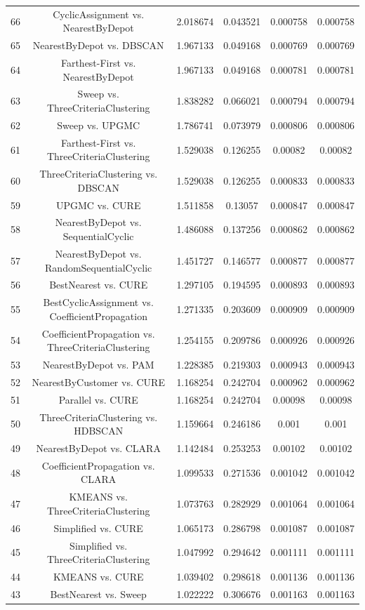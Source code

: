 \documentclass[a4paper,10pt]{article}
\begin{document}
\begin{landscape}
\begin{table}[!htp]
\begin{tabular}{cccccc}
66&CyclicAssignment vs. NearestByDepot&2.018674&0.043521&0.000758&0.000758\\
65&NearestByDepot vs. DBSCAN&1.967133&0.049168&0.000769&0.000769\\
64&Farthest-First vs. NearestByDepot&1.967133&0.049168&0.000781&0.000781\\
63&Sweep vs. ThreeCriteriaClustering&1.838282&0.066021&0.000794&0.000794\\
62&Sweep vs. UPGMC&1.786741&0.073979&0.000806&0.000806\\
61&Farthest-First vs. ThreeCriteriaClustering&1.529038&0.126255&0.00082&0.00082\\
60&ThreeCriteriaClustering vs. DBSCAN&1.529038&0.126255&0.000833&0.000833\\
59&UPGMC vs. CURE&1.511858&0.13057&0.000847&0.000847\\
58&NearestByDepot vs. SequentialCyclic&1.486088&0.137256&0.000862&0.000862\\
57&NearestByDepot vs. RandomSequentialCyclic&1.451727&0.146577&0.000877&0.000877\\
56&BestNearest vs. CURE&1.297105&0.194595&0.000893&0.000893\\
55&BestCyclicAssignment vs. CoefficientPropagation&1.271335&0.203609&0.000909&0.000909\\
54&CoefficientPropagation vs. ThreeCriteriaClustering&1.254155&0.209786&0.000926&0.000926\\
53&NearestByDepot vs. PAM&1.228385&0.219303&0.000943&0.000943\\
52&NearestByCustomer vs. CURE&1.168254&0.242704&0.000962&0.000962\\
51&Parallel vs. CURE&1.168254&0.242704&0.00098&0.00098\\
50&ThreeCriteriaClustering vs. HDBSCAN&1.159664&0.246186&0.001&0.001\\
49&NearestByDepot vs. CLARA&1.142484&0.253253&0.00102&0.00102\\
48&CoefficientPropagation vs. CLARA&1.099533&0.271536&0.001042&0.001042\\
47&KMEANS vs. ThreeCriteriaClustering&1.073763&0.282929&0.001064&0.001064\\
46&Simplified vs. CURE&1.065173&0.286798&0.001087&0.001087\\
45&Simplified vs. ThreeCriteriaClustering&1.047992&0.294642&0.001111&0.001111\\
44&KMEANS vs. CURE&1.039402&0.298618&0.001136&0.001136\\
43&BestNearest vs. Sweep&1.022222&0.306676&0.001163&0.001163\\

\end{tabular}
\end{table}
\end{landscape}
\end{document}
